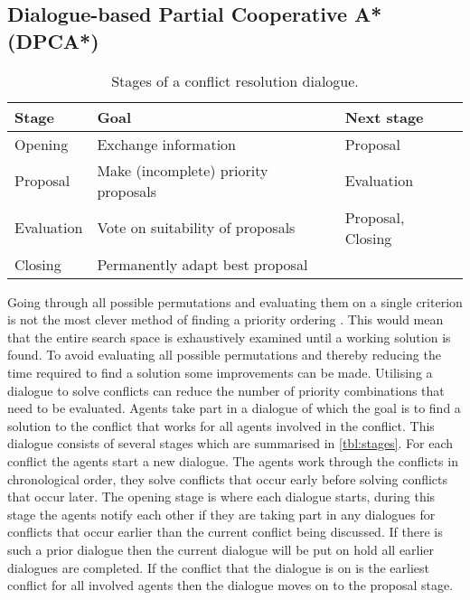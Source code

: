 \subsection{Dialogue-based Partial Cooperative A* (DPCA*)}
\begin{table}
    \centering
    \caption{Stages of a conflict resolution dialogue.}
    \label{tbl:stages}
    \begin{tabular}{l|l|l}
        Stage & Goal & Next stage \\ \hline
        Opening & Exchange information & Proposal \\
        Proposal & Make (incomplete) priority proposals & Evaluation \\
        Evaluation & Vote on suitability of proposals & Proposal, Closing \\
        Closing & Permanently adapt best proposal & \\
    \end{tabular}
\end{table}

Going through all possible permutations and evaluating them on a single
criterion is not the most clever method of finding a priority ordering
\cite{bennewitz2002}. This would mean that the entire search space is
exhaustively examined until a working solution is found. To avoid evaluating
all possible permutations and thereby reducing the time required to find a
solution some improvements can be made. Utilising a dialogue to solve conflicts
can reduce the number of priority combinations that need to be evaluated.
Agents take part in a dialogue of which the goal is to find a solution to the
conflict that works for all agents involved in the conflict. This dialogue
consists of several stages which are summarised in \autoref{tbl:stages}. For
each conflict the agents start a new dialogue. The agents work through the
conflicts in chronological order, they solve conflicts that occur early before
solving conflicts that occur later. The opening stage is where each dialogue
starts, during this stage the agents notify each other if they are taking part
in any dialogues for conflicts that occur earlier than the current conflict
being discussed. If there is such a prior dialogue then the current dialogue
will be put on hold all earlier dialogues are completed. If the conflict that
the dialogue is on is the earliest conflict for all involved agents then the
dialogue moves on to the proposal stage.

